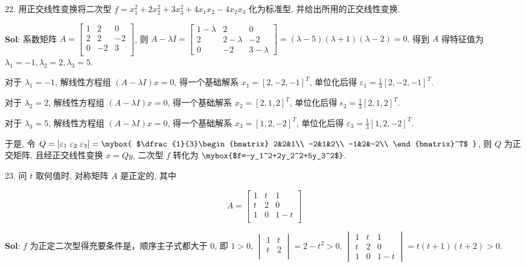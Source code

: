 

22. 用正交线性变换将二次型 $f=x_1^2+2x_2^2+3x_3^2+4x_1x_2-4x_2x_3$ 化为标准型, 并给出所用的正交线性变换.

\textbf{Sol}: 系数矩阵 $A=\begin{bmatrix}
    1&2&0\\
    2&2&-2\\
    0&-2&3\\
\end{bmatrix}$, 则 $A-\lambda I=\begin{bmatrix}
    1-\lambda&2&0\\
    2&2-\lambda&-2\\
    0&-2&3-\lambda
\end{bmatrix}=(\lambda-5)(\lambda+1)(\lambda-2)=0$. 得到 $A$ 得特征值为 $\lambda_1=-1,\lambda_2=2,\lambda_3=5$.

对于 $\lambda_1=-1$, 解线性方程组 $(A-\lambda I)x=0$, 得一个基础解系 $x_1=[2,-2,-1]^T$, 单位化后得 $\varepsilon_1=\frac{1}{3}[2,-2,-1]^T$.

对于 $\lambda_2=2$, 解线性方程组 $(A-\lambda I)x=0$, 得一个基础解系 $x_2=[2,1,2]^T$, 单位化后得 $\epsilon_2=\frac{1}{3}[2,1,2]^T$.

对于 $\lambda_3=5$, 解线性方程组 $(A-\lambda I)x=0$, 得一个基础解系 $x_3=[1,2,-2]^T$, 单位化后得 $\varepsilon_3=\frac{1}{3}[1,2,-2]^T$.

于是, 令 $Q=[\varepsilon_1\;\varepsilon_2\;\varepsilon_3]
=\mybox{
$\dfrac{1}{3}\begin{bmatrix}
    2&2&1\\
    -2&1&2\\
    -1&2&-2\\
\end{bmatrix}^T$
}$, 则 $Q$ 为正交矩阵, 
且经正交线性变换 $x=Qy$, 二次型 $f$ 转化为 $\mybox{$f=-y_1^2+2y_2^2+5y_3^2$}$.


\vspace{12pt}

23. 问 $t$ 取何值时, 对称矩阵 $A$ 是正定的, 其中 

$$
A=
\begin{bmatrix}
    1&t&1\\
    t&2&0\\
    1&0&1-t\\
\end{bmatrix}
$$

\textbf{Sol}: $f$ 为正定二次型得充要条件是，顺序主子式都大于 0, 即 $1>0$, $\begin{vmatrix}1&t\\t&2\\\end{vmatrix}=2-t^2>0$, $\begin{vmatrix}
    1&t&1\\
    t&2&0\\
    1&0&1-t
\end{vmatrix}=t(t+1)(t+2)>0$. 

